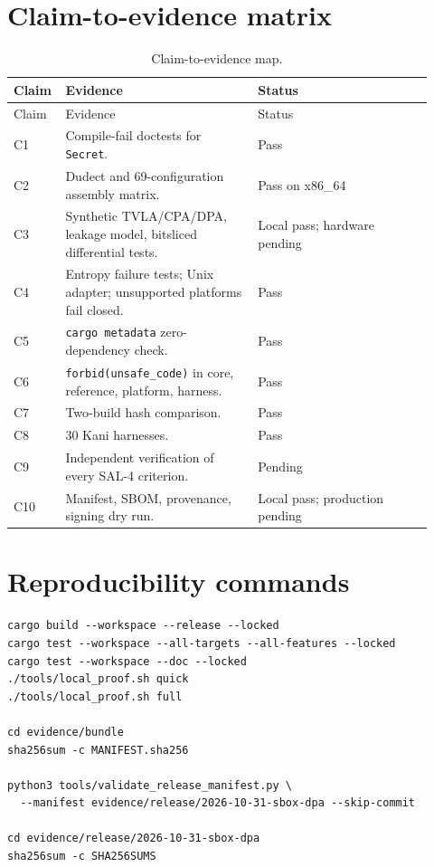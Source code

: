 \documentclass[11pt,a4paper]{article}
\newcommand{\code}[1]{\texttt{#1}}
\theoremstyle{plain}
\theoremstyle{definition}
\theoremstyle{remark}
\begin{document}
\section{Claim-to-evidence matrix}

\begin{longtable}{@{}p{0.08\linewidth}p{0.44\linewidth}p{0.40\linewidth}@{}}
\caption{Claim-to-evidence map.}\label{tab:claim-evidence}\\
\toprule
Claim & Evidence & Status \\
\midrule
\endfirsthead
\toprule
Claim & Evidence & Status \\
\midrule
\endhead
C1 & Compile-fail doctests for \code{Secret}. & Pass \\
C2 & Dudect and 69-configuration assembly matrix. & Pass on x86\_64 \\
C3 & Synthetic TVLA/CPA/DPA, leakage model, bitsliced differential tests. & Local pass; hardware pending \\
C4 & Entropy failure tests; Unix adapter; unsupported platforms fail closed. & Pass \\
C5 & \code{cargo metadata} zero-dependency check. & Pass \\
C6 & \code{forbid(unsafe\_code)} in core, reference, platform, harness. & Pass \\
C7 & Two-build hash comparison. & Pass \\
C8 & 30 Kani harnesses. & Pass \\
C9 & Independent verification of every SAL-4 criterion. & Pending \\
C10 & Manifest, SBOM, provenance, signing dry run. & Local pass; production pending \\
\bottomrule
\end{longtable}

\section{Reproducibility commands}

\begin{verbatim}
cargo build --workspace --release --locked
cargo test --workspace --all-targets --all-features --locked
cargo test --workspace --doc --locked
./tools/local_proof.sh quick
./tools/local_proof.sh full

cd evidence/bundle
sha256sum -c MANIFEST.sha256

python3 tools/validate_release_manifest.py \
  --manifest evidence/release/2026-10-31-sbox-dpa --skip-commit

cd evidence/release/2026-10-31-sbox-dpa
sha256sum -c SHA256SUMS
\end{verbatim}
\end{document}

